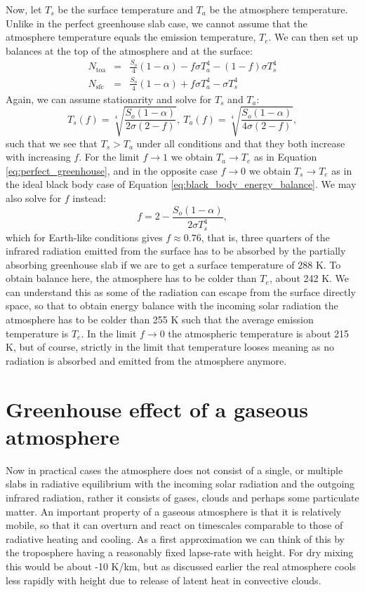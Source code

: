 \documentclass[12pt]{book}
\begin{document}
Now, let $T_s$ be the surface temperature and $T_a$ be the atmosphere temperature. Unlike in the perfect greenhouse slab case, we cannot assume that the atmosphere temperature equals the emission temperature, $T_e$. We can then set up balances at the top of the atmosphere and at the surface:
\begin{eqnarray}
N_\textrm{toa} &=&  \frac{S_o}{4}(1-\alpha) - f \sigma T_a^4 - (1-f)\sigma T_s^4 \nonumber \\ 
N_\textrm{sfc} &=&  \frac{S_o}{4}(1-\alpha) + f \sigma T_a^4 - \sigma T_s^4 \nonumber 
\end{eqnarray}
Again, we can assume stationarity and solve for $T_s$ and $T_a$:
\begin{equation}
T_s(f) = \sqrt[4]{\frac{S_o(1-\alpha)}{2\sigma(2-f)}}, \ T_a(f) =  \sqrt[4]{\frac{S_o(1-\alpha)}{4\sigma(2-f)}},
\label{eq:partial_absorbtion_solution}
\end{equation}
such that we see that $T_s > T_a$ under all conditions and that they both increase with increasing $f$. For the limit $f \rightarrow 1$ we obtain $T_a \rightarrow T_e$ as in Equation \ref{eq:perfect_greenhouse}, and in the opposite case $f \rightarrow 0$ we obtain $T_s \rightarrow T_e$ as in the ideal black body case of Equation \ref{eq:black_body_energy_balance}. We may also solve for $f$ instead:
\begin{equation}
f = 2 - \frac{S_o(1-\alpha)}{2\sigma T_s^4},
\end{equation}
which for Earth-like conditions gives $f \approx 0.76$, that is, three quarters of the infrared radiation emitted from the surface has to be absorbed by the partially absorbing greenhouse slab if we are to get a surface temperature of 288 K. To obtain balance here, the atmosphere has to be colder than $T_e$, about 242 K. We can understand this as some of the radiation can escape from the surface directly space, so that to obtain energy balance with the incoming solar radiation the atmosphere has to be colder than 255 K such that the average emission temperature is $T_e$. In the limit $f \rightarrow 0$ the atmospheric temperature is about 215 K, but of course, strictly in the limit that temperature looses meaning as no radiation is absorbed and emitted from the atmosphere anymore.


\section{Greenhouse effect of a gaseous atmosphere}
Now in practical cases the atmosphere does not consist of a single, or multiple slabs in radiative equilibrium with the incoming solar radiation and the outgoing infrared radiation, rather it consists of gases, clouds and perhaps some particulate matter. An important property of a gaseous atmosphere is that it is relatively mobile, so that it can overturn and react on timescales comparable to those of radiative heating and cooling. As a first approximation we can think of this by the troposphere having a reasonably fixed lapse-rate with height. For dry mixing this would be about -10 K/km, but as discussed earlier the real atmosphere cools less rapidly with height due to release of latent heat in convective clouds.
\end{document}
